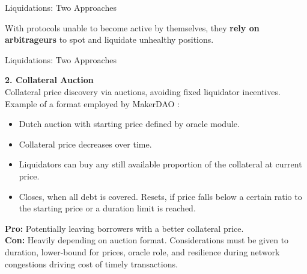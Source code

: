 \documentclass[handout]{beamer}
\begin{document}
\begin{frame}{Liquidations: Two Approaches}

With protocols unable to become active by themselves, they \textbf{rely on arbitrageurs} to spot and liquidate unhealthy positions.


\end{frame}


\begin{frame}{Liquidations: Two Approaches }


\textbf{2. Collateral Auction}\\
\vspace{0.2em}
Collateral price discovery via auctions, avoiding fixed liquidator incentives. Example of a format employed by MakerDAO \cite{MakerDAO}:
\begin{itemize}
\item Dutch auction with starting price defined by oracle module. 
\item Collateral price decreases over time. 
\item Liquidators can buy any still available proportion of the collateral at current price.
\item Closes, when all debt is covered. Resets, if price falls below a certain ratio to the starting price or a duration limit is reached.
\end{itemize}
\vspace{0.5em}

\textbf{Pro:} Potentially leaving borrowers with a better collateral price.\\
\vspace{0.5em}
\textbf{Con:} Heavily depending on auction format. Considerations must be given to duration, lower-bound for  prices, oracle role, and resilience during network congestions driving cost of timely transactions.


	
\end{frame}
\end{document}
